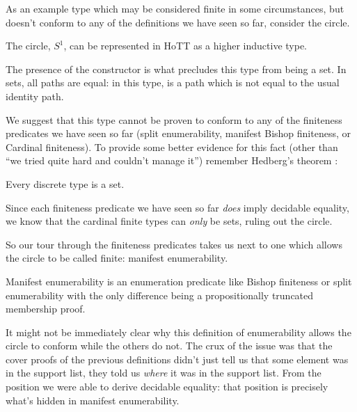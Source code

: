 As an example type which may be considered finite in some circumstances, but
doesn't conform to any of the definitions we have seen so far, consider the
circle.
\begin{definition}[\(S^1\)] \label{circle-def}
  The circle, \(S^1\), can be represented in HoTT as a higher inductive type.
  \begin{agdalisting}
  \end{agdalisting}
  The presence of the  constructor is what
  precludes this type from being a set.
  In sets, all paths are equal: in this type,  is a
  path which is not equal to the usual identity path.
\end{definition}

We suggest that this type cannot be proven to conform to any of the finiteness
predicates we have seen so far (split enumerability, manifest Bishop finiteness,
or Cardinal finiteness).
To provide some better evidence for this fact (other than ``we tried quite hard
and couldn't manage it'') remember Hedberg's theorem
\cite{hedbergCoherenceTheoremMartinLof1998}:
\begin{theorem}
  Every discrete type is a set.
\end{theorem}
Since each finiteness predicate we have seen so far \emph{does} imply decidable
equality, we know that the cardinal finite types can \emph{only} be sets, ruling
out the circle.

So our tour through the finiteness predicates takes us next to one which allows
the circle to be called finite: manifest enumerability.
\begin{definition}
  Manifest enumerability is an enumeration predicate like Bishop finiteness or
  split enumerability with the only difference being a propositionally truncated
  membership proof.
  \begin{agdalisting}
  \end{agdalisting}
\end{definition}

It might not be immediately clear why this definition of enumerability allows
the circle to conform while the others do not.
The crux of the issue was that the cover proofs of the previous definitions
didn't just tell us that some element was in the support list, they told us
\emph{where} it was in the support list.
From the position we were able to derive decidable equality: that position is
precisely what's hidden in manifest enumerability.

